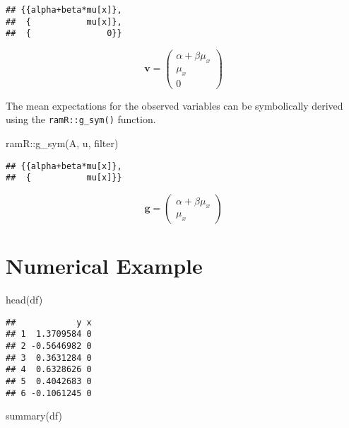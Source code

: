 \documentclass[
]{book}
\newenvironment{Shaded}{\begin{snugshade}}{\end{snugshade}}
\newcommand{\FunctionTok}[1]{\textcolor[rgb]{0.00,0.00,0.00}{#1}}
\newcommand{\NormalTok}[1]{#1}
\newcommand{\SpecialCharTok}[1]{\textcolor[rgb]{0.00,0.00,0.00}{#1}}
\theoremstyle{definition}
\theoremstyle{definition}
\theoremstyle{definition}
\theoremstyle{remark}
\begin{document}
\begin{verbatim}
## {{alpha+beta*mu[x]},
##  {           mu[x]},
##  {               0}}
\end{verbatim}

\begin{equation*}\mathbf{v} =\left( \begin{array}{c} \alpha  + \beta  \mu  _{x} \\ \mu  _{x} \\ 0 \end{array} \right)\end{equation*}

The mean expectations for the observed variables
can be symbolically derived using the \texttt{ramR::g\_sym()} function.

\begin{Shaded}
\begin{Highlighting}[]
\NormalTok{ramR}\SpecialCharTok{::}\FunctionTok{g\_sym}\NormalTok{(A, u, filter)}
\end{Highlighting}
\end{Shaded}

\begin{verbatim}
## {{alpha+beta*mu[x]},
##  {           mu[x]}}
\end{verbatim}

\begin{equation*}\mathbf{g} =\left( \begin{array}{c} \alpha  + \beta  \mu  _{x} \\ \mu  _{x} \end{array} \right)\end{equation*}

\hypertarget{numerical-example}{%
\section{Numerical Example}\label{numerical-example}}

\begin{Shaded}
\begin{Highlighting}[]
\FunctionTok{head}\NormalTok{(df)}
\end{Highlighting}
\end{Shaded}

\begin{verbatim}
##            y x
## 1  1.3709584 0
## 2 -0.5646982 0
## 3  0.3631284 0
## 4  0.6328626 0
## 5  0.4042683 0
## 6 -0.1061245 0
\end{verbatim}

\begin{Shaded}
\begin{Highlighting}[]
\FunctionTok{summary}\NormalTok{(df)}
\end{Highlighting}
\end{Shaded}
\end{document}
